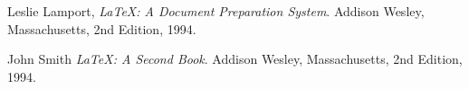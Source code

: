 \clearpage
{}

\begin{thebibliography}{999}

  Leslie Lamport,
  \emph{\LaTeX: A Document Preparation System}.
  Addison Wesley, Massachusetts,
  2nd Edition,
  1994.

  John Smith
  \emph{\LaTeX: A Second Book}.
  Addison Wesley, Massachusetts,
  2nd Edition,
  1994.

\end{thebibliography}